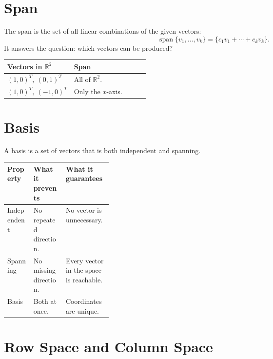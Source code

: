 \documentclass[10pt]{article}
\begin{document}
\section{Span}

The span is the set of all linear combinations of the given vectors:
\[
\operatorname{span}\{v_1,\ldots,v_k\}
=\{c_1v_1+\cdots+c_kv_k\}.
\]
It answers the question: which vectors can be produced?

\begin{center}
\small
\begin{tabularx}{0.82\linewidth}{@{}L{0.34\linewidth}Y@{}}
\toprule
Vectors in \(\mathbb{R}^2\) & Span \\
\midrule
\((1,0)^{T},\ (0,1)^{T}\) & All of \(\mathbb{R}^2\). \\
\((1,0)^{T},\ (-1,0)^{T}\) & Only the \(x\)-axis. \\
\bottomrule
\end{tabularx}
\end{center}


\section{Basis}

A basis is a set of vectors that is both independent and spanning.

\begin{center}
\small
\begin{tabularx}{\linewidth}{@{}L{0.25\linewidth}Y Y@{}}
\toprule
Property & What it prevents & What it guarantees \\
\midrule
Independent & No repeated direction. & No vector is unnecessary. \\
Spanning & No missing direction. & Every vector in the space is reachable. \\
Basis & Both at once. & Coordinates are unique. \\
\bottomrule
\end{tabularx}
\end{center}


\section{Row Space and Column Space}
\end{document}
